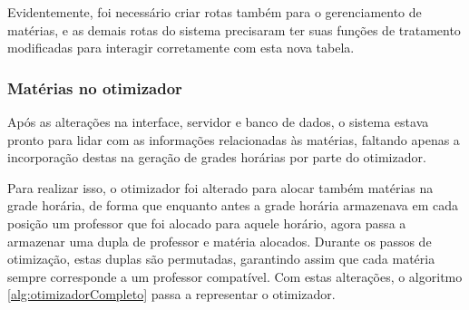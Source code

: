 Evidentemente, foi necessário criar rotas também para o gerenciamento de matérias, e as demais rotas do sistema precisaram ter suas funções de tratamento modificadas para interagir corretamente com esta nova tabela.

\subsubsection{Matérias no otimizador}
Após as alterações na interface, servidor e banco de dados, o sistema estava pronto para lidar com as informações relacionadas às matérias, faltando apenas a incorporação destas na geração de grades horárias por parte do otimizador. 

Para realizar isso, o otimizador foi alterado para alocar também matérias na grade horária, de forma que enquanto antes a grade horária armazenava em cada posição um professor que foi alocado para aquele horário, agora passa a armazenar uma dupla de professor e matéria alocados. Durante os passos de otimização, estas duplas são permutadas, garantindo assim que cada matéria sempre corresponde a um professor compatível. Com estas alterações, o algoritmo \ref{alg:otimizadorCompleto} passa a representar o otimizador.


